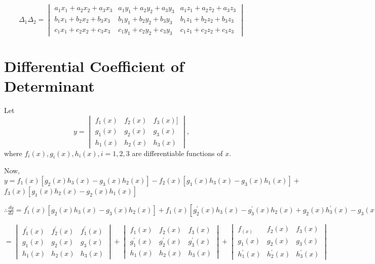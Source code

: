 $$\Delta_1\Delta_2 = \begin{vmatrix}a_1x_1 + a_2x_2 + a_3x_3 & a_1y_1 +
a_2y_2 + a_3y_3 & a_1z_1 + a_2z_2 + a_3z_3\\b_1x_1 + b_2x_2 + b_3x_3 & b_1y_1 +
b_2y_2 + b_3y_3 & b_1z_1 + b_2z_2 + b_3z_3 \\ c_1x_1 + c_2x_2 + c_3x_3 &
c_1y_1 + c_2y_2 + c_3y_3 & c_1z_1 + c_2z_2 + c_3z_3\end{vmatrix}$$

\section{Differential Coefficient of Determinant}
Let $$y = \begin{vmatrix}f_1(x) & f_2(x) & f_3(x)]\\g_1(x) & g_2(x) &
g_3(x)\\h_1(x) & h_2(x) & h_3(x)\end{vmatrix},$$ where $f_i(x), g_i(x),
h_i(x), i= 1, 2, 3$ are differentiable functions of $x.$

Now, $y = f_1(x)[g_2(x)h_3(x) - g_3(x)h_2(x)] - f_2(x)[g_1(x)h_3(x) -
g_3(x)h_1(x)] +$ $f_3(x)[g_1(x)h_2(x) - g_2(x)h_1(x)]$

$\therefore \frac{dy}{dx} = f_1^{\prime}(x)[g_2(x)h_3(x) -
g_3(x)h_2(x)] + f_1(x)[g_2^{\prime}(x)h_3(x) - g_3^{\prime}(x)h_2(x) +
g_2(x)h_3^{\prime}(x) - g_3(x)h_2^{\prime}(x)] +
-f_2^{\prime}(x)[g_1(x)h_3(x) - g_3(x)h_1(x)] +
-f_2(x)[g_1^{\prime}(x)h_3(x) - g_1(x)h_3^{\prime}(x) +
g_1(x)h_3^{\prime}(x) - g_3(x)h_3^{\prime}(x)] +
f_3^{\prime}(x)[g_1(x)h_2(x) - g_2(x)h_1(x)] +
f_3(x)[g_1^{\prime}(x)h_2(x) - g_2^{\prime}(x)h_1(x)x +
g_1(x)h_2^{\prime}(x) - g_2(x)h_1^{\prime}(x)]$

$$= \begin{vmatrix}f_1^{\prime}(x) & f_2^{\prime}(x) &
f_1^{\prime}(x)\\g_1(x) & g_2(x) & g_3(x)\\h_1(x) & h_2(x) &
h_3(x)\end{vmatrix} + \begin{vmatrix}f_1(x) & f_2(x) & f_3(x)\\g_1^{\prime}(x)
& g_2^{\prime}(x) & g_3^{\prime}(x) \\h_1(x) & h_2(x) & h_3(x) \end{vmatrix} +
\begin{vmatrix}f_(x) & f_2(x) & f_3(x)\\g_1(x) & g_2(x) &
g_3(x)\\h_1^{\prime}(x) & h_2^{\prime}(x) & h_3^{\prime}(x)\end{vmatrix}$$

